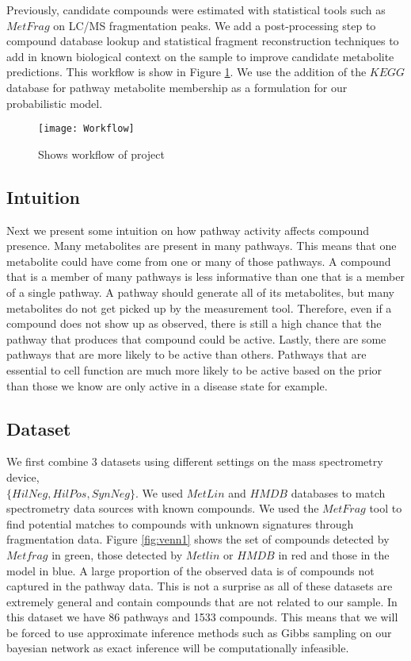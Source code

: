 \documentclass[11pt]{article}
\begin{document}
Previously, candidate compounds were estimated with statistical tools such as $MetFrag$ on LC/MS fragmentation peaks. We add a post-processing step to compound database lookup and statistical fragment reconstruction techniques to add in known biological context on the sample to improve candidate metabolite predictions. This workflow is show in Figure \ref{workflow}. We use the addition of the $KEGG$ database for pathway metabolite membership as a formulation for our probabilistic model. 

\begin{figure}
\centering
\texttt{[image: Workflow]}
\caption{Shows workflow of project}
\label{workflow}
\end{figure}

\subsection{Intuition}

Next we present some intuition on how pathway activity affects compound presence. Many metabolites are present in many pathways. This means that one metabolite could have come from one or many of those pathways. A compound that is a member of many pathways is less informative than one that is a member of a single pathway. A pathway should generate all of its metabolites, but many metabolites do not get picked up by the measurement tool. Therefore, even if a compound does not show up as observed, there is still a high chance that the pathway that produces that compound could be active. Lastly, there are some pathways that are more likely to be active than others. Pathways that are essential to cell function are much more likely to be active based on the prior than those we know are only active in a disease state for example. 

\subsection{Dataset}
We first combine 3 datasets using different settings on the mass spectrometry device, \\
$\{HilNeg, HilPos, SynNeg\}$. We used $MetLin$ and $HMDB$ databases to match spectrometry data sources with known compounds. We used the $MetFrag$ tool to find potential matches to compounds with unknown signatures through fragmentation data. Figure \ref{fig:venn1} shows the set of compounds detected by $Metfrag$ in green, those detected by $Metlin$ or $HMDB$ in red and those in the model in blue. A large proportion of the observed data is of compounds not captured in the pathway data. This is not a surprise as all of these datasets are extremely general and contain compounds that are not related to our sample. In this dataset we have 86 pathways and 1533 compounds. This means that we will be forced to use approximate inference methods such as Gibbs sampling on our bayesian network as exact inference will be computationally infeasible. 
\end{document}
